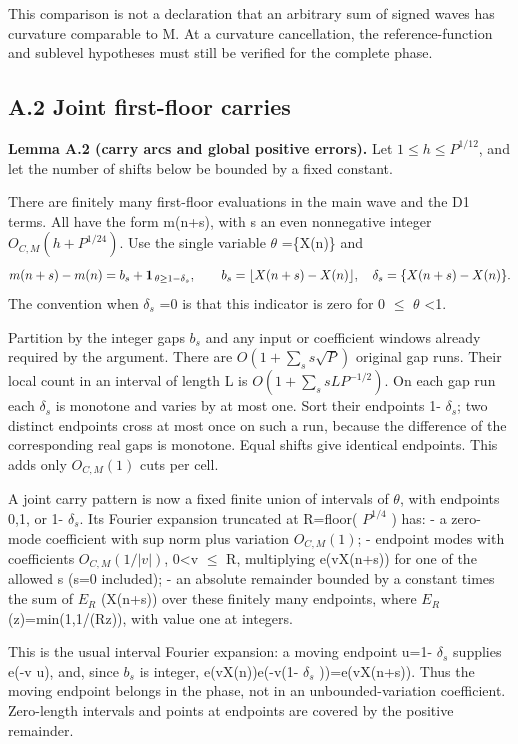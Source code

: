 \documentclass[11pt,a4paper]{article}
\begin{document}
This comparison is not a declaration that an arbitrary sum of signed
waves has curvature comparable to M. At a curvature cancellation, the
reference-function and sublevel hypotheses must still be verified for
the complete phase.

\subsection{A.2 Joint first-floor
carries}\label{a.2-joint-first-floor-carries}


\textbf{Lemma A.2 (carry arcs and global positive errors).} Let
\(1\le h\le P^{1/12}\), and let the number of shifts below be bounded by
a fixed constant.

There are finitely many first-floor evaluations in the main wave and the
D1 terms. All have the form m(n+s), with s an even nonnegative integer
\(O_{C,M}(h+P^{1/24})\). Use the single variable \(\theta\) =\{X(n)\}
and \[
m(n+s)-m(n)=b_s+
{\bf1}_{\,\theta\ge 1-\delta_s},\qquad
b_s=\lfloor X(n+s)-X(n)\rfloor,\quad
\delta_s=\{X(n+s)-X(n)\}.
\] The convention when \(\delta_s\) =0 is that this indicator is zero
for 0 \(\le\) \(\theta\) \textless1.

Partition by the integer gaps \(b_s\) and any input or coefficient
windows already required by the argument. There are
\(O(1+\sum_s s \sqrt{P})\) original gap runs. Their local count in an
interval of length L is \(O(1+\sum_s s L P^{-1/2})\). On each gap run
each \(\delta_s\) is monotone and varies by at most one. Sort their
endpoints 1- \(\delta_s\); two distinct endpoints cross at most once on
such a run, because the difference of the corresponding real gaps is
monotone. Equal shifts give identical endpoints. This adds only
\(O_{C,M}(1)\) cuts per cell.

A joint carry pattern is now a fixed finite union of intervals of
\(\theta\), with endpoints 0,1, or 1- \(\delta_s\). Its Fourier
expansion truncated at R=floor( \(P^{1/4}\) ) has: - a zero-mode
coefficient with sup norm plus variation \(O_{C,M}(1)\); - endpoint
modes with coefficients \(O_{C,M}(1/|v|)\),
0\textless\textbar v\textbar{} \(\le\) R, multiplying e(vX(n+s)) for one
of the allowed s (s=0 included); - an absolute remainder bounded by a
constant times the sum of \(E_R\) (X(n+s)) over these finitely many
endpoints, where \(E_R\)
(z)=min(1,1/(R\textbar\textbar z\textbar\textbar)), with value one at
integers.

This is the usual interval Fourier expansion: a moving endpoint u=1-
\(\delta_s\) supplies e(-v u), and, since \(b_s\) is integer,
e(vX(n))e(-v(1- \(\delta_s\) ))=e(vX(n+s)). Thus the moving endpoint
belongs in the phase, not in an unbounded-variation coefficient.
Zero-length intervals and points at endpoints are covered by the
positive remainder.
\end{document}
